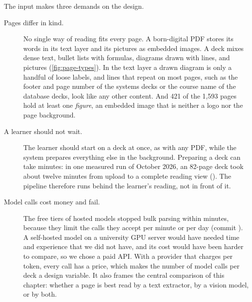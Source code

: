The input makes three demands on the design.

\begin{description}
  \item[Pages differ in kind.] No single way of reading fits
    every page. A born-digital PDF stores its
    words in its text layer and its pictures as embedded images. A deck mixes dense text, bullet lists with
    formulas, diagrams drawn with lines, and pictures (\cref{fig:page-types}).
    In the text layer a drawn diagram is only a handful of loose labels, and
    lines that repeat on most pages, such as the footer and page number of
    the systems decks or the course name of the database decks, look like any
    other content. And 421 of the 1{,}593 pages hold at least one
    \emph{figure}, an embedded image that is neither a logo nor the page
    background.
  \item[A learner should not wait.] The learner should start on a deck at once,
    as with any PDF, while the system prepares everything else in the
    background. Preparing a deck can take minutes: in one measured run of
    October 2026, an 82-page deck took about twelve minutes from upload to a
    complete reading view
    ().
    The pipeline therefore runs behind the learner's reading, not in front of it.
  \item[Model calls cost money and fail.] The free tiers of hosted models
    stopped bulk parsing within minutes, because they limit the calls they
    accept per minute or per day (commit ). A self-hosted model on a
    university GPU server would have needed time and experience that we did
    not have, and its cost would have been harder to compare, so we chose a
    paid API. With a provider that charges per token, every call has a price,
    which makes the number of model calls per deck a design variable. It also
    frames the central comparison of this chapter: whether a page is best read
    by a text extractor, by a vision model, or by both.
\end{description}

